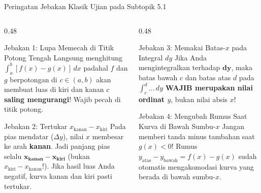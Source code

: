 \documentclass[aspectratio=43,10pt]{beamer}
\begin{document}
\begin{frame}{Peringatan Jebakan Klasik Ujian pada Subtopik 5.1}
    \begin{columns}[T]
        \begin{column}{0.48\textwidth}
            \begin{alertblock}{Jebakan 1: Lupa Memecah di Titik Potong Tengah}
                \scriptsize
                Langsung menghitung $\int_a^b [f(x) - g(x)]\,dx$ padahal $f$ dan $g$ berpotongan di $c \in (a, b)$ akan membuat luas di kiri dan kanan $c$ \textbf{saling mengurangi}! Wajib pecah di titik potong.
            \end{alertblock}

            \begin{alertblock}{Jebakan 2: Tertukar $x_{\text{kanan}} - x_{\text{kiri}}$}
                \scriptsize
                Pada pias mendatar ($\Delta y$), nilai $x$ membesar ke arah \textbf{kanan}. Jadi panjang pias selalu $\mathbf{x_{\text{kanan}} - x_{\text{kiri}}}$ (bukan $x_{\text{kiri}} - x_{\text{kanan}}$!). Jika hasil luas Anda negatif, kurva kanan dan kiri pasti tertukar.
            \end{alertblock}
        \end{column}

        \begin{column}{0.48\textwidth}
            \begin{alertblock}{Jebakan 3: Memakai Batas-$x$ pada Integral $dy$}
                \scriptsize
                Jika Anda mengintegralkan terhadap $\mathbf{dy}$, maka batas bawah $c$ dan batas atas $d$ pada $\int_c^d \dots\,dy$ \textbf{WAJIB merupakan nilai ordinat $y$}, bukan nilai absis $x$!
            \end{alertblock}

            \begin{exampleblock}{Jebakan 4: Mengubah Rumus Saat Kurva di Bawah Sumbu-$x$}
                \scriptsize
                Jangan memberi tanda minus tambahan saat $g(x) < 0$! Rumus $y_{\text{atas}} - y_{\text{bawah}} = f(x) - g(x)$ sudah otomatis mengakomodasi kurva yang berada di bawah sumbu-$x$.
            \end{exampleblock}
        \end{column}
    \end{columns}
\end{frame}
\end{document}
